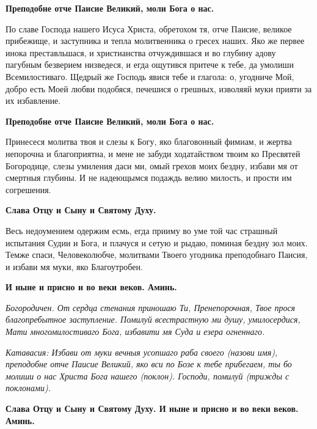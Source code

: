 \bfseries Преподобне отче Паисие Великий, моли Бога о нас.\normalfont{} 




По славе Господа нашего Исуса Христа, обретохом тя, отче Паисие, великое прибежище, и заступника и тепла молитвенника о гресех наших. Яко же первее инока преставльшася, и христианства отчуждившася и во глубину адову пагубным безверием низведеся, и егда ощутився притече к тебе, да умолиши Всемилостиваго. Щедрый же Господь явися тебе и глагола: о, угодниче Мой, добро есть Моей любви подобяся, печешися о грешных, изволяяй муки прияти за их избавление. 




\bfseries Преподобне отче Паисие Великий, моли Бога о нас.\normalfont{} 




Принесеся молитва твоя и слезы к Богу, яко благовонный фимиам, и жертва непорочна и благоприятна, и мене не забуди ходатайством твоим ко Пресвятей Богородице, слезы умиления даси ми, омый грехов моих бездну, избави мя от смертныя глубины. И не надеющымся подаждь велию милость, и прости им согрешения. 




\bfseries Слава Отцу и Сыну и Святому Духу.\normalfont{} 




Весь недоумением одержим есмь, егда прииму во уме той час страшный испытания Судии и Бога, и плачуся и сетую и рыдаю, поминая бездну зол моих. Темже спаси, Человеколюбче, молитвами Твоего угодника преподобнаго Паисия, и избави мя муки, яко Благоутробен. 




\bfseries И ныне и присно и во веки веков. Аминь.\normalfont{}




\itshape  Богородичен.\normalfont{} От сердца стенания приношаю Ти, Пренепорочная, Твое прося благопребытное заступление. Помилуй всестрастную ми душу, умилосердися, Мати многомилостиваго Бога, избавити мя Суда и езера огненнаго. 




\itshape Катавасия:\normalfont{} Избави от муки вечныя усопшаго раба своего (\itshape назови имя\normalfont{}), преподобне отче Паисие Великий, яко вси по Бозе к тебе прибегаем, ты бо молиши о нас Христа Бога нашего (\itshape поклон\normalfont{}). Господи, помилуй (\itshape трижды с поклонами\normalfont{}). 




\bfseries Слава Отцу и Сыну и Святому Духу. И ныне и присно и во веки веков. Аминь.\normalfont{} 




